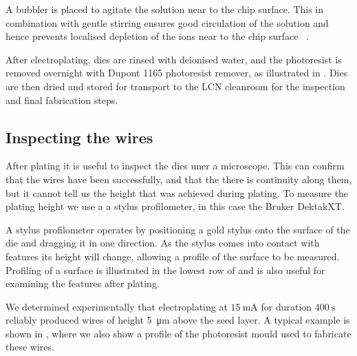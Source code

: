 A bubbler is placed to agitate the solution near to the chip surface. This in
combination with gentle stirring ensures good circulation of the solution and
hence prevents localised depletion of the ions near to the chip
surface~\cite{Schlesinger2011} .

After electroplating, dies are rinsed with deionised water, and the photoresist
is removed overnight with Dupont 1165 photoresist remover, as illustrated
in . Dies are then
dried and stored for transport to the LCN cleanroom for the inspection and
final fabrication steps.


\subsection{Inspecting the wires}
\label{fab:inspwire}

After plating it is useful to inspect the dies uner a microscope. This can
confirm that the wires have been  successfully, and that the there
is continuity along them, but it cannot tell us the height that was achieved
during plating. To measure the plating height we use a a stylus profilometer,
in this case the Bruker DektakXT.

A stylus profilometer operates by positioning a gold stylus onto the surface of
the die and dragging it in one direction. As the stylus comes into contact with
features its height will change, allowing a profile of the surface to be
measured. Profiling of a surface is illustrated in the lowest row of
 and is also useful for examining the features after
plating.

We determined experimentally that electroplating at $\SI{15}{\milli\ampere}$
for duration $\SI{400}{\second}$ reliably produced wires of height
\SI{5}{\micro\meter} above the seed layer. A typical example is shown in
, where we also show a profile of the photoresist
mould used to fabricate these wires.

